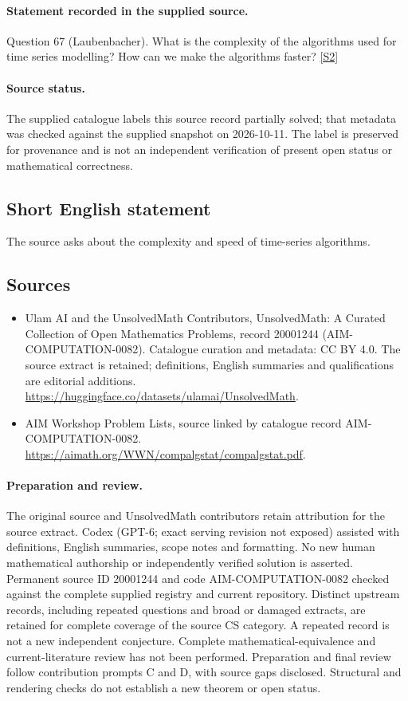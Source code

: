 \documentclass[11pt]{article}
\begin{document}
\paragraph{Statement recorded in the supplied source.}
Question 67 (Laubenbacher). What is the complexity of the algorithms used for time series modelling? How can we make the algorithms faster? \href{https://aimath.org/WWN/compalgstat/compalgstat.pdf}{[S2]}
\paragraph{Source status.}
The supplied catalogue labels this source record partially solved; that metadata was checked against the supplied snapshot on 2026-10-11. The label is preserved for provenance and is not an independent verification of present open status or mathematical correctness.
\subsection{Short English statement}
The source asks about the complexity and speed of time-series algorithms.
\subsection{Sources}
\begin{itemize}
\item[S1] Ulam AI and the UnsolvedMath Contributors, UnsolvedMath: A Curated Collection of Open Mathematics Problems, record 20001244 (AIM-COMPUTATION-0082). Catalogue curation and metadata: CC BY 4.0. The source extract is retained; definitions, English summaries and qualifications are editorial additions.
\url{https://huggingface.co/datasets/ulamai/UnsolvedMath}.
\item[S2] AIM Workshop Problem Lists, source linked by catalogue record AIM-COMPUTATION-0082.
\url{https://aimath.org/WWN/compalgstat/compalgstat.pdf}.
\end{itemize}
\paragraph{Preparation and review.}
The original source and UnsolvedMath contributors retain attribution for the source extract. Codex (GPT-6; exact serving revision not exposed) assisted with definitions, English summaries, scope notes and formatting. No new human mathematical authorship or independently verified solution is asserted. Permanent source ID 20001244 and code AIM-COMPUTATION-0082 checked against the complete supplied registry and current repository. Distinct upstream records, including repeated questions and broad or damaged extracts, are retained for complete coverage of the source CS category. A repeated record is not a new independent conjecture. Complete mathematical-equivalence and current-literature review has not been performed. Preparation and final review follow contribution prompts C and D, with source gaps disclosed. Structural and rendering checks do not establish a new theorem or open status.
\label{end:20001244}
\end{document}
